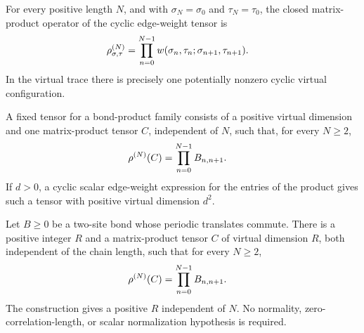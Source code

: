 \begin{lemma}
    \label{thm:mpdo_cyclic_edge_weight_tensor}
    \leanok
    For every positive length $N$, and with
    $\sigma_N=\sigma_0$ and $\tau_N=\tau_0$, the closed matrix-product
    operator of the cyclic edge-weight tensor is
    \begin{align}
        \rho^{(N)}_{\sigma,\tau}
         & =
        \prod_{n=0}^{N-1}
        w(\sigma_n,\tau_n;\sigma_{n+1},\tau_{n+1}).
        \notag
    \end{align}
    In the virtual trace there is precisely one potentially nonzero cyclic
    virtual configuration.
\end{lemma}

\begin{definition}
    \label{def:mpdo_fixed_bond_product_tensor}
    \leanok
    A fixed tensor for a bond-product family consists of a positive virtual
    dimension and one matrix-product tensor $C$, independent of $N$, such
    that, for every $N\ge2$,
    \begin{align}
        \rho^{(N)}(C)
         & =\prod_{n=0}^{N-1}B_{n,n+1}.
        \notag
    \end{align}
    If $d>0$, a cyclic scalar edge-weight expression for the entries of the
    product gives such a tensor with positive virtual dimension $d^2$.
\end{definition}

\begin{lemma}
    \label{thm:mpdo_eta_fixed_bond_product_tensor}
    \leanok
    Let $B\ge0$ be a two-site bond whose periodic translates commute. There
    is a positive integer $R$ and a matrix-product tensor $C$ of virtual
    dimension $R$, both independent of the chain length, such that for every
    $N\ge2$,
    \begin{align}
        \rho^{(N)}(C)
         & =\prod_{n=0}^{N-1}B_{n,n+1}.
        \notag
    \end{align}
    The construction gives a positive $R$ independent of $N$. No normality,
    zero-correlation-length, or scalar normalization hypothesis is required.
\end{lemma}

